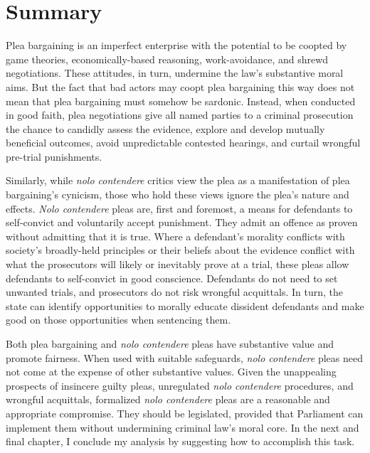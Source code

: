 \section{Summary}

Plea bargaining is an imperfect enterprise with the potential to be coopted by game theories, economically-based reasoning, work-avoidance, and shrewd negotiations. These attitudes, in turn, undermine the law's substantive moral aims. But the fact that bad actors may coopt plea bargaining this way does not mean that plea bargaining must somehow be sardonic. Instead, when conducted in good faith, plea negotiations give all named parties to a criminal prosecution the chance to candidly assess the evidence, explore and develop mutually beneficial outcomes, avoid unpredictable contested hearings, and curtail wrongful pre-trial punishments.

Similarly, while \textit{nolo contendere} critics view the plea as a manifestation of plea bargaining's cynicism, those who hold these views ignore the plea's nature and effects. \textit{Nolo contendere} pleas are, first and foremost, a means for defendants to self-convict and voluntarily accept punishment. They admit an offence as proven without admitting that it is true. Where a defendant's morality conflicts with society's broadly-held principles or their beliefs about the evidence conflict with what the prosecutors will likely or inevitably prove at a trial, these pleas allow defendants to self-convict in good conscience. Defendants do not need to set unwanted trials, and prosecutors do not risk wrongful acquittals. In turn, the state can identify opportunities to morally educate dissident defendants and make good on those opportunities when sentencing them.

Both plea bargaining and \textit{nolo contendere} pleas have substantive value and promote fairness. When used with suitable safeguards, \textit{nolo contendere} pleas need not come at the expense of other substantive values. Given the unappealing prospects of insincere guilty pleas, unregulated \textit{nolo contendere} procedures, and wrongful acquittals, formalized \textit{nolo contendere} pleas are a reasonable and appropriate compromise. They should be legislated, provided that Parliament can implement them without undermining criminal law's moral core. In the next and final chapter, I conclude my analysis by suggesting how to accomplish this task.